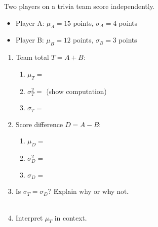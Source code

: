 \documentclass[10pt]{article}
\begin{document}
\begin{tcolorbox}[colback=goldbg!60, colframe=goldacc, title=\textbf{Tier A --- Approaching Proficiency},
    arc=2mm, boxrule=0.8pt, left=4mm, right=4mm, top=3mm, bottom=3mm]
\small
Two players on a trivia team score independently.
\begin{itemize}[leftmargin=1.5em, itemsep=2pt]
  \item Player A: $\mu_A = 15$ points, $\sigma_A = 4$ points
  \item Player B: $\mu_B = 12$ points, $\sigma_B = 3$ points
\end{itemize}

\begin{enumerate}[leftmargin=1.5em, itemsep=10pt]
  \item Team total $T = A + B$:
        \begin{enumerate}[label=(\alph*), itemsep=6pt]
          \item $\mu_T = $ \blank{4cm}
          \item $\sigma^2_T = $ \blank{4cm} (show computation)
          \item $\sigma_T = $ \blank{4cm}
        \end{enumerate}

  \item Score difference $D = A - B$:
        \begin{enumerate}[label=(\alph*), itemsep=6pt]
          \item $\mu_D = $ \blank{4cm}
          \item $\sigma^2_D = $ \blank{4cm}
          \item $\sigma_D = $ \blank{4cm}
        \end{enumerate}

  \item Is $\sigma_T = \sigma_D$? Explain why or why not.\\
        \writeline\\[1pt]\writeline

  \item Interpret $\mu_T$ in context.\\
        \writeline\\[1pt]\writeline
\end{enumerate}
\end{tcolorbox}

\vspace{0.12in}
\end{document}
